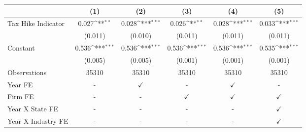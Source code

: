 {
\def\sym#1{\ifmmode^{#1}\else\(^{#1}\)\fi}
\begin{tabular}{l*{5}{c}}
\toprule
                    &\multicolumn{1}{c}{(1)}         &\multicolumn{1}{c}{(2)}         &\multicolumn{1}{c}{(3)}         &\multicolumn{1}{c}{(4)}         &\multicolumn{1}{c}{(5)}         \\
\midrule
Tax Hike Indicator  &       0.027\sym{**} &       0.028\sym{***}&       0.026\sym{**} &       0.028\sym{***}&       0.033\sym{***}\\
                    &     (0.011)         &     (0.010)         &     (0.011)         &     (0.011)         &     (0.011)         \\
Constant            &       0.536\sym{***}&       0.536\sym{***}&       0.536\sym{***}&       0.536\sym{***}&       0.535\sym{***}\\
                    &     (0.005)         &     (0.005)         &     (0.001)         &     (0.001)         &     (0.001)         \\
\midrule
Observations        &       35310         &       35310         &       35310         &       35310         &       35310         \\
Year FE             &           -         &$\checkmark$         &           -         &$\checkmark$         &           -         \\
Firm FE             &           -         &           -         &$\checkmark$         &$\checkmark$         &$\checkmark$         \\
Year X State FE     &           -         &           -         &           -         &           -         &$\checkmark$         \\
Year X Industry FE  &           -         &           -         &           -         &           -         &$\checkmark$         \\
\bottomrule
\end{tabular}
}
